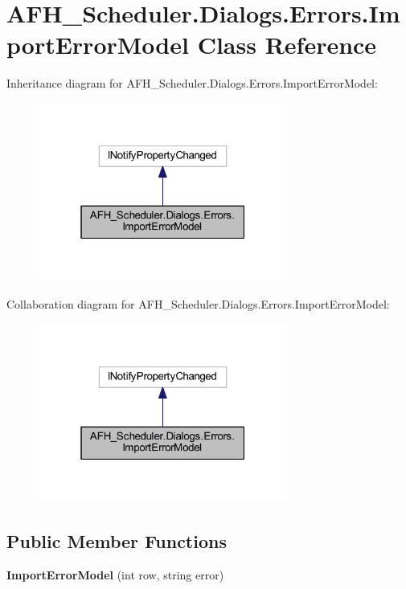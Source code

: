\section{A\+F\+H\+\_\+\+Scheduler.\+Dialogs.\+Errors.\+Import\+Error\+Model Class Reference}
\label{class_a_f_h___scheduler_1_1_dialogs_1_1_errors_1_1_import_error_model}


Inheritance diagram for A\+F\+H\+\_\+\+Scheduler.\+Dialogs.\+Errors.\+Import\+Error\+Model\+:
\nopagebreak
\begin{figure}[H]
\begin{center}
\leavevmode
\includegraphics[width=232pt]{class_a_f_h___scheduler_1_1_dialogs_1_1_errors_1_1_import_error_model__inherit__graph}
\end{center}
\end{figure}


Collaboration diagram for A\+F\+H\+\_\+\+Scheduler.\+Dialogs.\+Errors.\+Import\+Error\+Model\+:
\nopagebreak
\begin{figure}[H]
\begin{center}
\leavevmode
\includegraphics[width=232pt]{class_a_f_h___scheduler_1_1_dialogs_1_1_errors_1_1_import_error_model__coll__graph}
\end{center}
\end{figure}
\subsection*{Public Member Functions}
\begin{DoxyCompactItemize}
\item 
\textbf{ Import\+Error\+Model} (int row, string error)
\end{DoxyCompactItemize}
